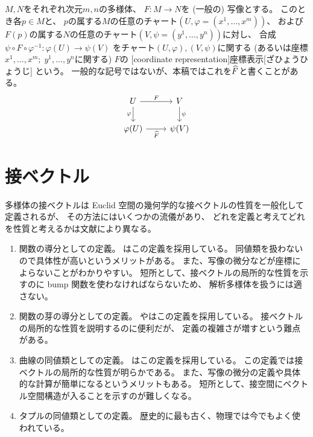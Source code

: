 \documentclass[report]{jlreq}
\begin{document}
\begin{definition}[座標表示]
    $M, N$をそれぞれ次元$m, n$の多様体、
    $F \colon M \to N$を (一般の) 写像とする。
    このとき各$p \in M$と、
    $p$の属する$M$の任意のチャート$(U, \varphi = (x^1, \dots, x^m))$、
    および
    $F(p)$の属する$N$の任意のチャート$(V, \psi = (y^1, \dots, y^n))$に対し、
    合成
    $\psi \circ F \circ \varphi^{-1}
        \colon \varphi(U) \to \psi(V)$
    をチャート$(U, \varphi), (V, \psi)$に関する
    (あるいは座標$x^1, \dots, x^m; \; y^1, \dots, y^n$に関する)
    $F$の
    [coordinate representation]{座標表示}[ざひょうひょうじ]
    という。
    一般的な記号ではないが、本稿ではこれを$\widehat{F}$と書くことがある。
    \begin{equation}
        \begin{tikzcd}
            U
                \ar{r}{F}
                \ar{d}[swap]{\varphi}
                & V
                    \ar{d}{\psi} \\
            \varphi(U)
                \ar{r}[swap]{\what{F}}
                & \psi(V)
        \end{tikzcd}
    \end{equation}
\end{definition}



%
\section{接ベクトル}

多様体の接ベクトルは
Euclid 空間の幾何学的な接ベクトルの性質を一般化して定義されるが、
その方法にはいくつかの流儀があり、
どれを定義と考えてどれを性質と考えるかは文献により異なる。

\begin{enumerate}
    \item {\smooth}関数の導分としての定義。
        \cite{Lee12}はこの定義を採用している。
        同値類を扱わないので具体性が高いというメリットがある。
        また、写像の微分などが座標によらないことがわかりやすい。
        短所として、接ベクトルの局所的な性質を示すのに
        bump 関数を使わなければならないため、
        解析多様体を扱うには適さない。
    \item {\smooth}関数の芽の導分としての定義。
        \cite{Tu17}や\cite{松本88}はこの定義を採用している。
        接ベクトルの局所的な性質を説明するのに便利だが、
        定義の複雑さが増すという難点がある。
    \item 曲線の同値類としての定義。
        \cite{Wed16}はこの定義を採用している。
        この定義では接ベクトルの局所的な性質が明らかである。
        また、写像の微分の定義や具体的な計算が簡単になるというメリットもある。
        短所として、接空間にベクトル空間構造が入ることを示すのが難しくなる。
    \item タプルの同値類としての定義。
        歴史的に最も古く、物理では今でもよく使われている。
\end{enumerate}
\end{document}

